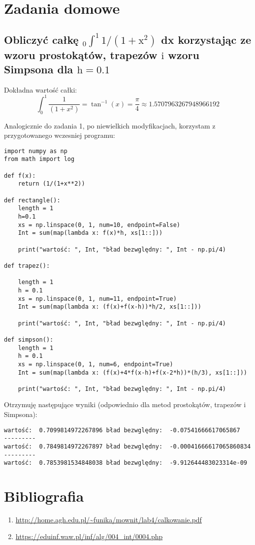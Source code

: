 \documentclass[5]{article}
\begin{document}
\section{Zadania domowe}

\subsection{Obliczyć całkę ${ }_{0} \int^{1} 1 /\left(1+\mathrm{x}^{2}\right)$ dx korzystając ze wzoru prostokątów, trapezów $\mathrm{i}$ wzoru Simpsona dla $\mathrm{h}=0.1$}

Dokładna wartość całki:
$$
\int_{0}^{1} \frac{1}{\left(1+x^{2}\right)}=\tan^{-1}(x) = \frac{\pi}{4} \approx 1.5707963267948966192
$$

Analogicznie do zadania 1, po niewielkich modyfikacjach, korzystam z przygotowanego wczesniej programu:

\begin{verbatim}
import numpy as np
from math import log

def f(x):
    return (1/(1+x**2))

def rectangle():
    length = 1
    h=0.1
    xs = np.linspace(0, 1, num=10, endpoint=False)
    Int = sum(map(lambda x: f(x)*h, xs[1::]))

    print("wartość: ", Int, "bład bezwględny: ", Int - np.pi/4)

def trapez():

    length = 1
    h = 0.1
    xs = np.linspace(0, 1, num=11, endpoint=True)
    Int = sum(map(lambda x: (f(x)+f(x-h))*h/2, xs[1::]))

    print("wartość: ", Int, "bład bezwględny: ", Int - np.pi/4)

def simpson():
    length = 1
    h = 0.1
    xs = np.linspace(0, 1, num=6, endpoint=True)
    Int = sum(map(lambda x: (f(x)+4*f(x-h)+f(x-2*h))*(h/3), xs[1::]))

    print("wartość: ", Int, "bład bezwględny: ", Int - np.pi/4)

\end{verbatim}

Otrzymuję następujące wyniki (odpowiednio dla metod prostokątów, trapezów i Simpsona):

\begin{verbatim}
wartość:  0.7099814972267896 bład bezwględny:  -0.07541666617065867
---------
wartość:  0.7849814972267897 bład bezwględny:  -0.00041666617065860834
---------
wartość:  0.7853981534848038 bład bezwględny:  -9.912644483023314e-09
\end{verbatim}



\section{Bibliografia}

\begin{enumerate}
  \item \url{http://home.agh.edu.pl/~funika/mownit/lab4/calkowanie.pdf}
  \item \url{https://eduinf.waw.pl/inf/alg/004_int/0004.php}
\end{enumerate}
\end{document}
